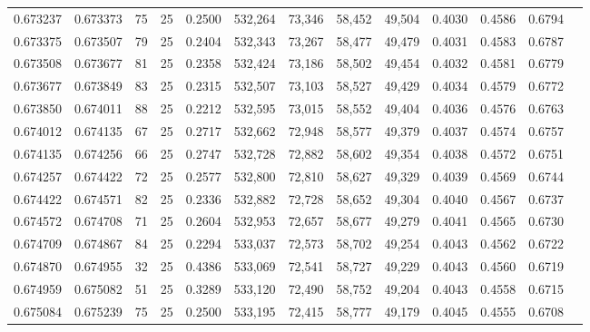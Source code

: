 \begin{tabular}{rrrrrrrrrrrrr}
0.673237 & 0.673373 &    75 &  25 &                                     0.2500 & 532,264 &  73,346 &  58,452 &  49,504 & 0.4030 & 0.4586 & 0.6794 \\
0.673375 & 0.673507 &    79 &  25 &                                     0.2404 & 532,343 &  73,267 &  58,477 &  49,479 & 0.4031 & 0.4583 & 0.6787 \\
0.673508 & 0.673677 &    81 &  25 &                                     0.2358 & 532,424 &  73,186 &  58,502 &  49,454 & 0.4032 & 0.4581 & 0.6779 \\
0.673677 & 0.673849 &    83 &  25 &                                     0.2315 & 532,507 &  73,103 &  58,527 &  49,429 & 0.4034 & 0.4579 & 0.6772 \\
0.673850 & 0.674011 &    88 &  25 &                                     0.2212 & 532,595 &  73,015 &  58,552 &  49,404 & 0.4036 & 0.4576 & 0.6763 \\
0.674012 & 0.674135 &    67 &  25 &                                     0.2717 & 532,662 &  72,948 &  58,577 &  49,379 & 0.4037 & 0.4574 & 0.6757 \\
0.674135 & 0.674256 &    66 &  25 &                                     0.2747 & 532,728 &  72,882 &  58,602 &  49,354 & 0.4038 & 0.4572 & 0.6751 \\
0.674257 & 0.674422 &    72 &  25 &                                     0.2577 & 532,800 &  72,810 &  58,627 &  49,329 & 0.4039 & 0.4569 & 0.6744 \\
0.674422 & 0.674571 &    82 &  25 &                                     0.2336 & 532,882 &  72,728 &  58,652 &  49,304 & 0.4040 & 0.4567 & 0.6737 \\
0.674572 & 0.674708 &    71 &  25 &                                     0.2604 & 532,953 &  72,657 &  58,677 &  49,279 & 0.4041 & 0.4565 & 0.6730 \\
0.674709 & 0.674867 &    84 &  25 &                                     0.2294 & 533,037 &  72,573 &  58,702 &  49,254 & 0.4043 & 0.4562 & 0.6722 \\
0.674870 & 0.674955 &    32 &  25 &                                     0.4386 & 533,069 &  72,541 &  58,727 &  49,229 & 0.4043 & 0.4560 & 0.6719 \\
0.674959 & 0.675082 &    51 &  25 &                                     0.3289 & 533,120 &  72,490 &  58,752 &  49,204 & 0.4043 & 0.4558 & 0.6715 \\
0.675084 & 0.675239 &    75 &  25 &                                     0.2500 & 533,195 &  72,415 &  58,777 &  49,179 & 0.4045 & 0.4555 & 0.6708 \\

\end{tabular}
